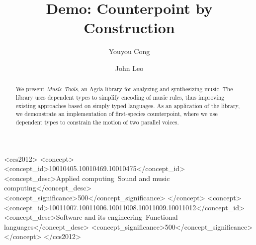 \documentclass[sigplan,10pt,screen]{acmart}
\begin{document}
\title{Demo: Counterpoint by Construction}


\author{Youyou Cong}

\author{John Leo}


\begin{abstract}
We present \emph{Music Tools}, an Agda library for analyzing 
and synthesizing music.  
The library uses dependent types to simplify encoding of 
music rules, thus improving existing approaches based on 
simply typed languages.  
As an application of the library, we demonstrate an 
implementation of first-species counterpoint, where we use
dependent types to constrain the motion of two parallel
voices.
\end{abstract}


\begin{CCSXML}
<ccs2012>
<concept>
<concept_id>10010405.10010469.10010475</concept_id>
<concept_desc>Applied computing~Sound and music computing</concept_desc>
<concept_significance>500</concept_significance>
</concept>
<concept>
<concept_id>10011007.10011006.10011008.10011009.10011012</concept_id>
<concept_desc>Software and its engineering~Functional languages</concept_desc>
<concept_significance>500</concept_significance>
</concept>
</ccs2012>
\end{CCSXML}


\end{document}
